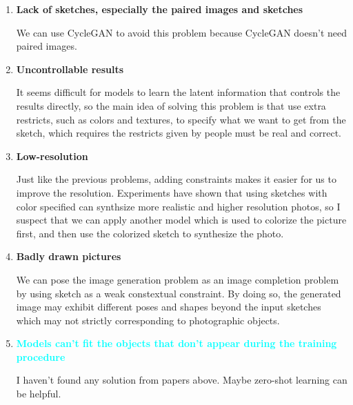\documentclass{article}
\begin{document}
\begin{enumerate}
\item \textbf{Lack of sketches, especially the paired images and sketches}\par
We can use CycleGAN to avoid this problem because CycleGAN doesn't need paired images.


\item \textbf{Uncontrollable results}\par
It seems difficult for models to learn the latent information that controls the results directly, so the main idea of solving this problem is that use extra restricts, such as colors and textures, to specify what we want to get from the sketch, which requires the restricts given by people must be real and correct. 


\item \textbf{Low-resolution}\par
Just like the previous problems, adding constraints makes it easier for us to improve the resolution. Experiments have shown that using sketches with color specified can synthsize more realistic and higher resolution photos, so I suspect that we can apply another model which is used to colorize the picture first, and then use the colorized sketch to synthesize the photo.

\item \textbf{Badly drawn pictures}\par
We can pose the image generation problem as an image completion problem by using sketch as a weak constextual constraint. By doing so, the generated image may exhibit different poses and shapes beyond the input sketches which may not strictly corresponding to photographic objects.




\item \textbf{\textcolor{cyan}{Models can't fit the objects that don't appear during the training procedure}} \par
I haven't found any solution from papers above. Maybe zero-shot learning can be helpful.

\end{enumerate}





\end{document}
